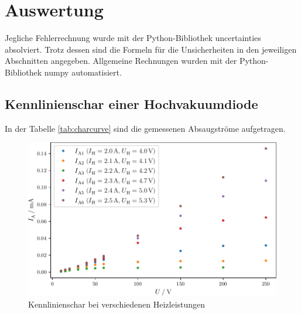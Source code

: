 \section{Auswertung}
\label{sec:Auswertung}
Jegliche Fehlerrechnung wurde mit der Python-Bibliothek uncertainties \cite{uncertainties} absolviert. Trotz dessen sind die Formeln für
die Unsicherheiten in den jeweiligen Abschnitten angegeben. Allgemeine Rechnungen wurden mit der Python-Bibliothek numpy \cite{numpy} automatisiert.
\subsection{Kennlinienschar einer Hochvakuumdiode}
In der Tabelle \ref{tab:charcurve} sind die gemessenen Absaugströme aufgetragen.
\begin{figure}
    \centering
    \caption{Kennlinienschar bei verschiedenen Heizleistungen}
    \label{fig:charcurve}
    \includegraphics[width = \textwidth]{build/charcurve.pdf}
\end{figure}
